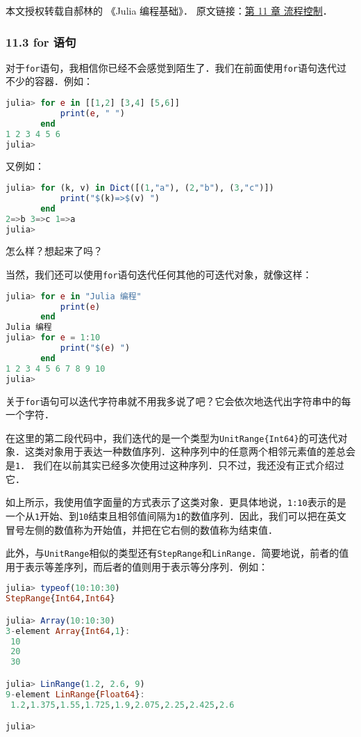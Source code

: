 
本文授权转载自郝林的 《Julia 编程基础》． 原文链接：\href{https://github.com/hyper0x/JuliaBasics/blob/master/book/ch11.md}{第 11 章 流程控制}．


\subsubsection{11.3 for 语句}

对于\verb`for`语句，我相信你已经不会感觉到陌生了．我们在前面使用\verb`for`语句迭代过不少的容器．例如：
\begin{lstlisting}[language=julia]
julia> for e in [[1,2] [3,4] [5,6]]
           print(e, " ")
       end
1 2 3 4 5 6 
julia> 
\end{lstlisting}

又例如：
\begin{lstlisting}[language=julia]
julia> for (k, v) in Dict([(1,"a"), (2,"b"), (3,"c")])
           print("$(k)=>$(v) ")
       end
2=>b 3=>c 1=>a 
julia> 
\end{lstlisting}

怎么样？想起来了吗？

当然，我们还可以使用\verb|for|语句迭代任何其他的可迭代对象，就像这样：
\begin{lstlisting}[language=julia]
julia> for e in "Julia 编程"
           print(e)
       end
Julia 编程
julia> for e = 1:10
           print("$(e) ")
       end
1 2 3 4 5 6 7 8 9 10 
julia> 
\end{lstlisting}

关于\verb|for|语句可以迭代字符串就不用我多说了吧？它会依次地迭代出字符串中的每一个字符．

在这里的第二段代码中，我们迭代的是一个类型为\verb|UnitRange{Int64}|的可迭代对象．这类对象用于表达一种数值序列．这种序列中的任意两个相邻元素值的差总会是\verb`1`．
我们在以前其实已经多次使用过这种序列．只不过，我还没有正式介绍过它．

如上所示，我使用值字面量的方式表示了这类对象．更具体地说，\verb|1:10|表示的是一个从\verb|1|开始、到\verb|10|结束且相邻值间隔为\verb|1|的数值序列．因此，我们可以把在英文冒号左侧的数值称为开始值，并把在它右侧的数值称为结束值．

此外，与\verb|UnitRange|相似的类型还有\verb|StepRange|和\verb|LinRange|．简要地说，前者的值用于表示等差序列，而后者的值则用于表示等分序列．例如：
\begin{lstlisting}[language=julia]
julia> typeof(10:10:30)
StepRange{Int64,Int64}

julia> Array(10:10:30)
3-element Array{Int64,1}:
 10
 20
 30

julia> LinRange(1.2, 2.6, 9)
9-element LinRange{Float64}:
 1.2,1.375,1.55,1.725,1.9,2.075,2.25,2.425,2.6

julia> 
\end{lstlisting}

